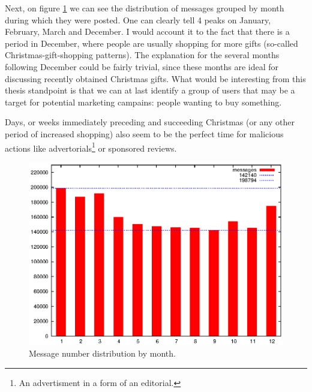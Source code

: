     Next, on figure \ref{fig:dist_month} we can see the distribution of messages grouped by month during which they were posted. One can clearly tell 4 peaks on January, February, March and December. I would account it to the fact that there is a  period in December, where people are usually shopping for more gifts (so-called Christmas-gift-shopping patterns)\cite{FischerArnold1990,ArnoldReynolds2003}. The explanation for the several months following December could be fairly trivial, since these months are ideal for discussing recently obtained Christmas gifts. What would be interesting from this thesis standpoint is that we can at last identify a group of users that may be a target for potential marketing campains: people wanting to buy something.
    
    Days, or weeks immediately preceding and succeeding Christmas (or any other period of increased shopping) also seem to be the perfect time for malicious actions like advertorials\footnote{An advertisment in a form of an editorial.} or sponsored reviews.
    \begin{figure}[H]
      \includegraphics[width=\textwidth]{chapters/03_implementation/monthly}
      \caption{Message number distribution by month.}
      \label{fig:dist_month}
    \end{figure}
    
